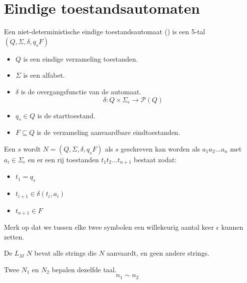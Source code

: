 \documentclass[main.tex]{subfiles}
\begin{document}
\section{Eindige toestandsautomaten}
\label{sec:eind-toest}

\begin{de}
  Een niet-deterministische eindige toestandsautomaat () is een 5-tal $(Q,\Sigma,\delta,q_{s}F)$
  \begin{itemize}
  \item $Q$ is een eindige verzameling toestanden.
  \item $\Sigma$ is een alfabet.
  \item $\delta$ is de overgangsfunctie van de automaat.
  \[ \delta: Q \times \Sigma_{\epsilon} \rightarrow \mathcal{P}(Q) \]
  \item $q_{s} \in Q$ is de starttoestand.
  \item $F \subseteq Q$ is de verzameling aanvaardbare eindtoestanden.
  \end{itemize}
\end{de}

\begin{de}
  Een  $s$ wordt  $N=(Q,\Sigma,\delta,q_{s}F)$ als $s$ geschreven kan worden als $a_{1}a_{2}\ldots a_{n}$ met $a_{i} \in \Sigma_{\epsilon}$ en er een rij toestanden $t_{1}t_{2}\ldots t_{n+1}$ bestaat zodat:
  \begin{itemize}
  \item $t_{1} = q_{s}$
  \item $t_{i+1} \in \delta(t_{i},a_{i})$
  \item $t_{n+1} \in F$
  \end{itemize}
  Merk op dat we tussen elke twee symbolen een willekeurig aantal keer $\epsilon$ kunnen zetten.
\end{de}

\begin{de}
  De  $L_{M}$  $N$ bevat alle strings die $N$ aanvaardt, en geen andere strings.
\end{de}

\begin{de}
  Twee  $N_{1}$ en $N_{2}$ bepalen dezelfde taal.
  \[ n_{1} \sim n_{2} \]
\end{de}
\end{document}

